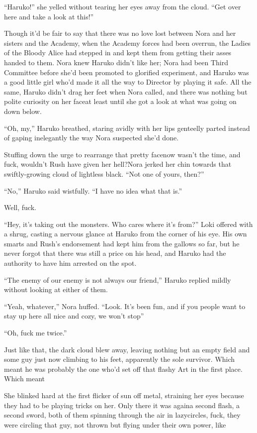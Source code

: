 ``Haruko!'' she yelled without tearing her eyes away from the cloud. ``Get over here and take a look at this!''

Though it'd be fair to say that there was no love lost between Nora and her sisters and the Academy, when the Academy forces had been overrun, the Ladies of the Bloody Alice had stepped in and kept them from getting their asses handed to them. Nora knew Haruko didn't like her; Nora had been Third Committee before she'd been promoted to glorified experiment, and Haruko was a good little girl who'd made it all the way to Director by playing it safe. All the same, Haruko didn't drag her feet when Nora called, and there was nothing but polite curiosity on her face\textemdash at least until she got a look at what was going on down below.

``Oh, my,'' Haruko breathed, staring avidly with her lips genteelly parted instead of gaping inelegantly the way Nora suspected she'd done.

Stuffing down the urge to rearrange that pretty face\textemdash now wasn't the time, and fuck, wouldn't Rush have given her hell?\textemdash Nora jerked her chin towards that swiftly-growing cloud of lightless black. ``Not one of yours, then?''

``No,'' Haruko said wistfully. ``I have no idea what that is.''

Well, fuck.

``Hey, it's taking out the monsters. Who cares where it's from?'' Loki offered with a shrug, casting a nervous glance at Haruko from the corner of his eye. His own smarts and Rush's endorsement had kept him from the gallows so far, but he never forgot that there was still a price on his head, and Haruko had the authority to have him arrested on the spot.

``The enemy of our enemy is not always our friend,'' Haruko replied mildly without looking at either of them.

``Yeah, whatever,'' Nora huffed. ``Look. It's been fun, and if you people want to stay up here all nice and cozy, we won't stop\textemdash ''

``Oh, fuck me twice.''

Just like that, the dark cloud blew away, leaving nothing but an empty field and some guy just now climbing to his feet, apparently the sole survivor. Which meant he was probably the one who'd set off that flashy Art in the first place. Which meant\textemdash 

She blinked hard at the first flicker of sun off metal, straining her eyes because they had to be playing tricks on her. Only there it was again\textemdash a second flash, a second sword, both of them spinning through the air in lazy\textemdash circles, fuck, they were circling that guy, not thrown but flying under their own power, like\textemdash 

